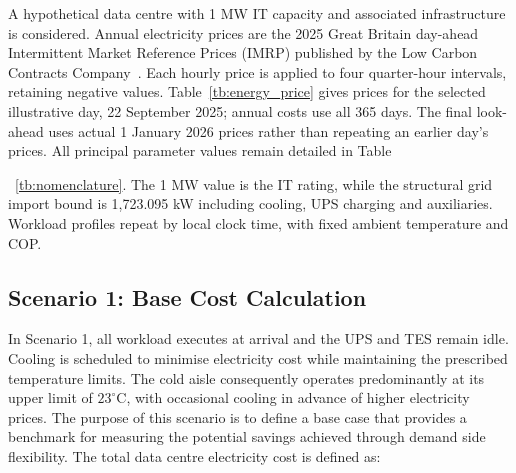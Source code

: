 \documentclass[lettersize,journal]{IEEEtran}
\providecommand{\DIFadd}[1]{{\color{blue}#1}}
\providecommand{\DIFaddbegin}{}
\providecommand{\DIFaddend}{}
\providecommand{\DIFaddFL}[1]{\DIFadd{#1}}
\providecommand{\DIFaddbeginFL}{}
\providecommand{\DIFaddendFL}{}
\begin{document}
\DIFaddend A hypothetical data centre with 1 MW IT capacity and associated infrastructure is considered.  \DIFaddbegin \DIFadd{Annual electricity prices are the 2025 Great Britain }\DIFaddend day-ahead  \DIFaddbegin \DIFadd{Intermittent Market Reference Prices (IMRP) published by the Low Carbon Contracts Company~\cite{lccc_imrp_actuals}. Each hourly price is applied to four quarter-hour intervals, retaining negative values. Table~\ref{tb:energy_price} gives prices for the selected illustrative day, 22 September 2025; annual costs use all 365 days. The final look-ahead uses actual 1 January 2026 prices rather than repeating an earlier day's prices. All principal parameter values remain }\DIFaddend detailed in Table \DIFaddbegin \DIFadd{~\ref{tb:nomenclature}. The 1 MW value is the IT rating, while the structural grid import bound is 1,723.095 kW including cooling, UPS charging and auxiliaries. Workload profiles repeat by local clock time, with fixed ambient temperature and COP.

}\DIFaddend 

\begin{table}[!t]
\caption{Day-Ahead  \DIFaddbeginFL \DIFaddFL{Reference }\DIFaddendFL Prices \DIFaddbeginFL \DIFaddFL{on 22 September 2025}\DIFaddendFL }
\label{tb:energy_price}
\centering
 \DIFaddbeginFL {}
\DIFaddendFL \end{table}

\subsection{Scenario 1: Base Cost Calculation}\label{sec:scenario 1}
 \DIFaddbegin \DIFadd{In Scenario 1, all workload executes at arrival and the UPS and TES remain idle. Cooling is scheduled to minimise electricity cost while maintaining the prescribed temperature limits. The cold aisle consequently operates predominantly at its upper limit of $23^\circ$C, with occasional cooling in advance of higher electricity prices. The }\DIFaddend purpose of this scenario is to define a base case that provides a benchmark for measuring the potential savings achieved through demand side flexibility. The total  \DIFaddbegin \DIFadd{data centre }\DIFaddend electricity cost is defined as:
\end{document}
